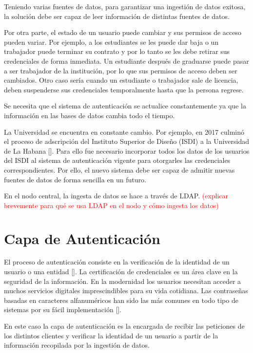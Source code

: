 Teniendo varias fuentes de datos, para garantizar una ingestión de datos exitosa, la solución debe ser capaz de leer información de distintas fuentes de datos. 

Por otra parte, el estado de un usuario puede cambiar y sus permisos de acceso pueden variar. Por ejemplo, a los estudiantes se les puede dar baja o un trabajador puede terminar su contrato y por lo tanto se les debe retirar sus credenciales de forma inmediata. Un estudiante después de graduarse puede pasar a ser trabajador de la institución, por lo que sus permisos de acceso deben ser cambiados. Otro caso sería cuando un estudiante o trabajador sale de licencia, deben suspenderse sus credenciales temporalmente hasta que la persona regrese. 

Se necesita que el sistema de autenticación se actualice constantemente ya que la información en las bases de datos cambia todo el tiempo.

La Universidad  se encuentra en constante cambio. Por ejemplo, en 2017 culminó el proceso de adscripción del Instituto Superior de Diseño (ISDI) a la Universidad de La Habana [\cite{isdi-historia}]. Para ello fue necesario incorporar todos los datos de los usuarios del ISDI al sistema de autenticación vigente para otorgarles las credenciales correspondientes. Por ello, el nuevo sistema debe ser capaz de admitir nuevas fuentes de datos de forma sencilla en un futuro. 

En el nodo central, la ingesta de datos se hace a través de LDAP. \textcolor{red}{(explicar brevemente para qué se usa LDAP en el nodo y cómo ingesta los datos)}

\section*{Capa de Autenticación}
El proceso de autenticación consiste en la verificación de la identidad de un usuario o una entidad  [\cite{teheran2014mecanismo}]. La certificación de credenciales es un área clave en la seguridad de la información. En la modernidad los usuarios necesitan acceder a muchos servicios digitales imprescindibles para su vida cotidiana. Las contraseñas basadas en caracteres alfanuméricos han sido las más comunes en todo tipo de sistemas por su fácil implementación [\cite{rodriguez2018seguridad}].

En este caso la capa de autenticación es la encargada de recibir las peticiones de los distintos clientes y verificar la identidad de un usuario a partir de la información recopilada por la ingestión de datos.

